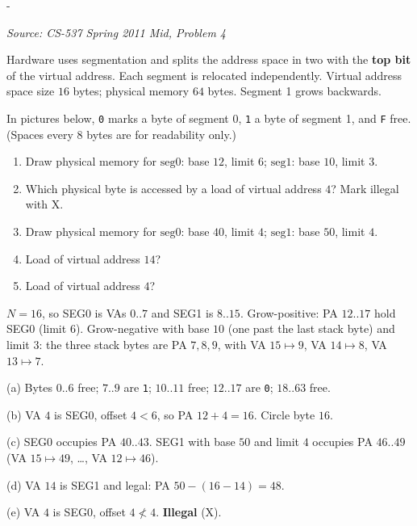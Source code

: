 \documentclass[11pt,a4paper]{article}
\makeatletter
\newcommand{\keepspace}[1]{\par\penalty-100\begingroup
  \setlength{\dimen@}{#1}\dimen@ii\pagegoal\advance\dimen@ii-\pagetotal
  \ifdim\dimen@>\dimen@ii\ifdim\dimen@ii>\z@\vfil\fi\break\fi\endgroup}
\newcounter{qn}[section]
\newenvironment{Qn}[4]{%
  \refstepcounter{qn}\keepspace{7\baselineskip}%
  \begin{tcolorbox}[qboxstyle, title={Q\thesection.\theqn\ \ [#1 \textbar\ #2]\ \ #4}]%
  {\footnotesize\color{g3}\textit{Source: #3}}\par\smallskip%
}{%
  \end{tcolorbox}%
}
\newenvironment{Sol}{%
  \begin{tcolorbox}[sboxstyle, title={Solution}]%
}{%
  \end{tcolorbox}\vspace{0.35em}%
}
\makeatother
\begin{document}
\begin{Qn}{Medium-Hard}{Lect 10}{CS-537 Spring 2011 Mid, Problem 4}{Draw the two-segment layout, then translate two VAs}
Hardware uses segmentation and splits the address space in two with the
\textbf{top bit} of the virtual address. Each segment is relocated
independently. Virtual address space size $16$ bytes; physical memory
$64$ bytes. Segment 1 grows backwards.

In pictures below, \texttt{0} marks a byte of segment 0, \texttt{1} a
byte of segment 1, and \texttt{F} free. (Spaces every 8 bytes are
for readability only.)
\begin{enumerate}
  \item[(a)] Draw physical memory for
        $\mathrm{seg0}$: base $12$, limit $6$;
        $\mathrm{seg1}$: base $10$, limit $3$.
  \item[(b)] Which physical byte is accessed by a load of virtual
        address $4$? Mark illegal with X.
  \item[(c)] Draw physical memory for
        $\mathrm{seg0}$: base $40$, limit $4$;
        $\mathrm{seg1}$: base $50$, limit $4$.
  \item[(d)] Load of virtual address $14$?
  \item[(e)] Load of virtual address $4$?
\end{enumerate}
\end{Qn}
\begin{Sol}
$N=16$, so SEG0 is VAs $0..7$ and SEG1 is $8..15$.
Grow-positive: PA $12..17$ hold SEG0 (limit $6$).
Grow-negative with base $10$ (one past the last stack byte) and limit
$3$: the three stack bytes are PA $7,8,9$, with VA $15\mapsto 9$,
VA $14\mapsto 8$, VA $13\mapsto 7$.

(a) Bytes $0..6$ free; $7..9$ are \texttt{1}; $10..11$ free;
$12..17$ are \texttt{0}; $18..63$ free.

(b) VA $4$ is SEG0, offset $4<6$, so PA $12+4=16$. Circle byte $16$.

(c) SEG0 occupies PA $40..43$. SEG1 with base $50$ and limit $4$
occupies PA $46..49$ (VA $15\mapsto 49$, \ldots, VA $12\mapsto 46$).

(d) VA $14$ is SEG1 and legal: PA $50-(16-14)=48$.

(e) VA $4$ is SEG0, offset $4\not< 4$. \textbf{Illegal} (X).
\end{Sol}
\end{document}
